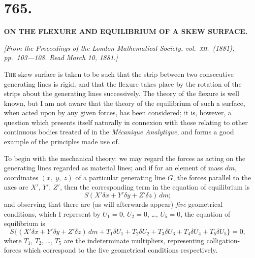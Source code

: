 \documentclass[11pt,a4paper,english]{article}
\theoremstyle{plain}
\begin{document}
\newpage

\section*{765.}

\begin{center}
\textbf{ON THE FLEXURE AND EQUILIBRIUM OF A SKEW SURFACE.}
\end{center}

\noindent\textit{[From the \textit{Proceedings of the London Mathematical Society}, vol.\ \textsc{xii}.\ (1881), pp.\ 103---108. Read March 10, 1881.]}

\vspace{\baselineskip}

\textsc{The} skew surface is taken to be such that the strip between two consecutive generating lines is rigid, and that the flexure takes place by the rotation of the strips about the generating lines successively. The theory of the flexure is well known, but I am not aware that the theory of the equilibrium of such a surface, when acted upon by any given forces, has been considered; it is, however, a question which presents itself naturally in connexion with those relating to other continuous bodies treated of in the \textit{M\'{e}canique Analytique}, and forms a good example of the principles made use of.

To begin with the mechanical theory: we may regard the forces as acting on the generating lines regarded as material lines; and if for an element of mass $dm$, coordinates $(x,\; y,\; z)$ of a particular generating line $G$, the forces parallel to the axes are $X'$, $Y'$, $Z'$, then the corresponding term in the equation of equilibrium is
\[
S(X'\delta x + Y'\delta y + Z'\delta z)\,dm;
\]
and observing that there are (as will afterwards appear) \textit{five} geometrical conditions, which I represent by $U_1 = 0$, $U_2 = 0$, \ldots, $U_5 = 0$, the equation of equilibrium is
\[
S\{(X'\delta x + Y'\delta y + Z'\delta z)\,dm + T_1\delta U_1 + T_2\delta U_2 + T_3\delta U_3 + T_4\delta U_4 + T_5\delta U_5\} = 0,
\]
where $T_1$, $T_2$, \ldots, $T_5$ are the indeterminate multipliers, representing colligation-forces which correspond to the five geometrical conditions respectively.
\end{document}
